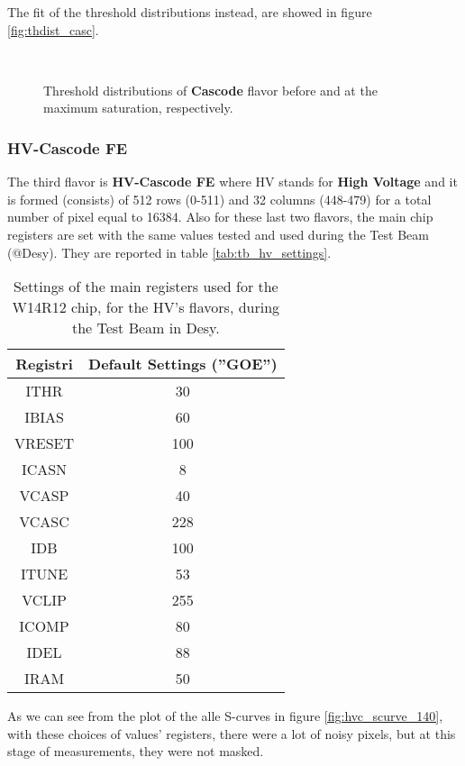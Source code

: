The fit of the threshold distributions instead, are showed in figure \vref{fig:thdist_casc}.

\begin{figure}[h!]
\centering
{}\quad
{}\\
\caption{Threshold distributions of \textbf{Cascode} flavor before and at the maximum saturation, respectively.}
\label{fig:thdist_casc}
\end{figure}


\subsubsection{HV-Cascode FE}

The third flavor is \textbf{HV-Cascode FE} where HV stands for \textbf{High Voltage} and it is formed (consists) of 512 rows (0-511) and 32 columns (448-479) for a total number of pixel equal to 16384. Also for these last two flavors, the main chip registers are set with the same values tested and used during the Test Beam (@Desy). They are reported in table \vref{tab:tb_hv_settings}.

\begin{table}[h!]
\centering
\begin{tabular}{c|c}
Registri & Default Settings (''GOE'') \\
\hline
ITHR & 30 \\
\hline
IBIAS & 60 \\
\hline
VRESET & 100 \\
\hline
ICASN & 8 \\
\hline
VCASP & 40 \\
\hline
VCASC & 228 \\
\hline
IDB & 100 \\
\hline
ITUNE & 53 \\
\hline
VCLIP & 255 \\
\hline
ICOMP & 80 \\
\hline
IDEL & 88 \\
\hline
IRAM & 50 \\
\hline
\end{tabular}
\caption{Settings of the main registers used for the W14R12 chip, for the HV's flavors, during the Test Beam in Desy.}
\label{tab:tb_hv_settings}
\end{table}

As we can see from the plot of the alle S-curves in figure \vref{fig:hvc_scurve_140}, with these choices of values' registers, there were a lot of noisy pixels, but at this stage of measurements, they were not masked.

